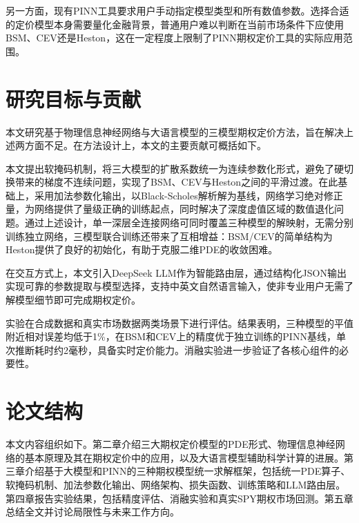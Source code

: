 另一方面，现有PINN工具要求用户手动指定模型类型和所有数值参数。选择合适的定价模型本身需要量化金融背景，普通用户难以判断在当前市场条件下应使用BSM、CEV还是Heston，这在一定程度上限制了PINN期权定价工具的实际应用范围。

\section{研究目标与贡献}\label{sec:contributions}

本文研究基于物理信息神经网络与大语言模型的三模型期权定价方法，旨在解决上述两方面不足。在方法设计上，本文的主要贡献可概括如下。

本文提出软掩码机制，将三大模型的扩散系数统一为连续参数化形式，避免了硬切换带来的梯度不连续问题，实现了BSM、CEV与Heston之间的平滑过渡。在此基础上，采用加法参数化输出，以Black-Scholes解析解为基线，网络学习绝对修正量，为网络提供了量级正确的训练起点，同时解决了深度虚值区域的数值退化问题。通过上述设计，单一深层全连接网络可同时覆盖三种模型的解映射，无需分别训练独立网络，三模型联合训练还带来了互相增益：BSM/CEV的简单结构为Heston提供了良好的初始化，有助于克服二维PDE的收敛困难。

在交互方式上，本文引入DeepSeek LLM作为智能路由层，通过结构化JSON输出实现可靠的参数提取与模型选择，支持中英文自然语言输入，使非专业用户无需了解模型细节即可完成期权定价。

实验在合成数据和真实市场数据两类场景下进行评估。结果表明，三种模型的平值附近相对误差均低于1\%，在BSM和CEV上的精度优于独立训练的PINN基线，单次推断耗时约2毫秒，具备实时定价能力。消融实验进一步验证了各核心组件的必要性。

\section{论文结构}\label{sec:structure}

本文内容组织如下。第二章介绍三大期权定价模型的PDE形式、物理信息神经网络的基本原理及其在期权定价中的应用，以及大语言模型辅助科学计算的进展。第三章介绍基于大模型和PINN的三种期权模型统一求解框架，包括统一PDE算子、软掩码机制、加法参数化输出、网络架构、损失函数、训练策略和LLM路由层。第四章报告实验结果，包括精度评估、消融实验和真实SPY期权市场回测。第五章总结全文并讨论局限性与未来工作方向。
